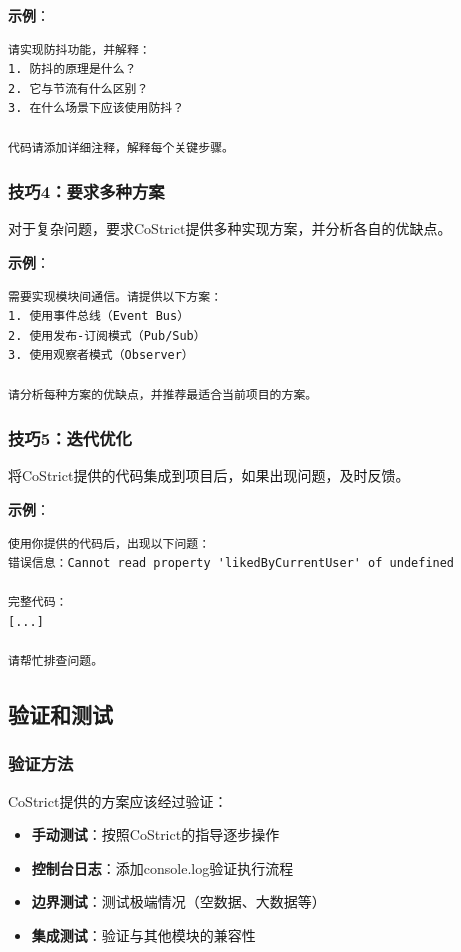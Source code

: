 \documentclass[12pt,a4paper]{article}
\begin{document}
\begin{itemize}
\textbf{示例}：
\begin{verbatim}
请实现防抖功能，并解释：
1. 防抖的原理是什么？
2. 它与节流有什么区别？
3. 在什么场景下应该使用防抖？

代码请添加详细注释，解释每个关键步骤。
\end{verbatim}

\subsubsection{技巧4：要求多种方案}

对于复杂问题，要求CoStrict提供多种实现方案，并分析各自的优缺点。

\textbf{示例}：
\begin{verbatim}
需要实现模块间通信。请提供以下方案：
1. 使用事件总线（Event Bus）
2. 使用发布-订阅模式（Pub/Sub）
3. 使用观察者模式（Observer）

请分析每种方案的优缺点，并推荐最适合当前项目的方案。
\end{verbatim}

\subsubsection{技巧5：迭代优化}

将CoStrict提供的代码集成到项目后，如果出现问题，及时反馈。

\textbf{示例}：
\begin{verbatim}
使用你提供的代码后，出现以下问题：
错误信息：Cannot read property 'likedByCurrentUser' of undefined

完整代码：
[...]

请帮忙排查问题。
\end{verbatim}

\subsection{验证和测试}

\subsubsection{验证方法}

CoStrict提供的方案应该经过验证：

\begin{itemize}
    \item \textbf{手动测试}：按照CoStrict的指导逐步操作
    \item \textbf{控制台日志}：添加console.log验证执行流程
    \item \textbf{边界测试}：测试极端情况（空数据、大数据等）
    \item \textbf{集成测试}：验证与其他模块的兼容性
\end{itemize}


\end{itemize}
\end{document}
